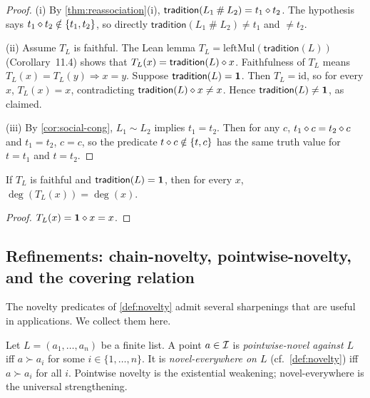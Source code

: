 \begin{proof}
(i) By \cref{thm:reassociation}(i), $\mathsf{tradition}(L_1\mathbin{\#}
L_2) = t_1\mathbin{\diamond} t_2$. The hypothesis says $t_1\mathbin{\diamond} t_2 \notin
\{t_1,t_2\}$, so directly
$\mathsf{tradition}(L_1\mathbin{\#}L_2) \neq t_1$ and $\neq t_2$.

(ii) Assume $T_L$ is faithful. The Lean
lemma $T_L = \mathrm{leftMul}(\mathsf{tradition}(L))$ (Corollary~11.4)
shows that $T_L(x) = \mathsf{tradition}(L)\mathbin{\diamond} x$. Faithfulness of
$T_L$ means $T_L(x) = T_L(y) \Rightarrow x=y$. Suppose
$\mathsf{tradition}(L) = \mathbf{1}$. Then $T_L = \mathrm{id}$, so for every
$x$, $T_L(x) = x$, contradicting $\mathsf{tradition}(L)\mathbin{\diamond} x \neq
x$. Hence $\mathsf{tradition}(L)\neq \mathbf{1}$, as claimed.

(iii) By \cref{cor:social-cong}, $L_1\sim L_2$ implies $t_1 = t_2$.
Then for any $c$, $t_1\mathbin{\diamond} c = t_2\mathbin{\diamond} c$ and $t_1 = t_2$,
$c=c$, so the predicate $t\mathbin{\diamond} c \notin \{t,c\}$ has the same truth
value for $t = t_1$ and $t=t_2$.
\end{proof}

\begin{corollary}
\label{cor:faithful-degree}
If $T_L$ is faithful and $\mathsf{tradition}(L) = \mathbf{1}$, then for every
$x$, $\deg(T_L(x)) = \deg(x)$.
\end{corollary}

\begin{proof}
$T_L(x) = \mathbf{1}\mathbin{\diamond} x = x$.
\end{proof}

\subsection*{Refinements: chain-novelty, pointwise-novelty, and the
covering relation}

The novelty predicates of \cref{def:novelty} admit several
sharpenings that are useful in applications. We collect them here.

\begin{definition}\label{def:pointwise-novelty}
Let $L = (a_1,\dots,a_n)$ be a finite list. A point $a\in\mathcal{I}$ is
\emph{pointwise-novel against $L$} iff $a \succ a_i$ for some
$i\in\{1,\dots,n\}$. It is \emph{novel-everywhere on $L$} (cf.\
\cref{def:novelty}) iff $a\succ a_i$ for all $i$. Pointwise novelty
is the existential weakening; novel-everywhere is the universal
strengthening.
\end{definition}

